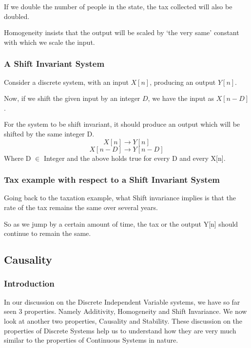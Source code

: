 If we double the number of people in the state, the tax collected will also be doubled. 

Homogeneity insists that the output will be scaled by ‘the very same’ constant with which we scale the input. 


\begin{figure}
\centering

\end{figure}



\subsubsection{A Shift Invariant System}
Consider a discrete system, with an input $X[n]$, producing an output $Y[n]$. 

Now, if we shift the given input by an integer $D$, we have the input as $X[n-D]$. 

For the system to be shift invariant, it should produce an output which will be shifted by the same integer D.
$$X[n]\rightarrow Y[n]$$
$$X[n-D]\rightarrow Y[n-D]$$
Where D $\in$ Integer and the above holds true for every D and every X[n].

\subsubsection{Tax example with respect to a Shift Invariant System}
Going back to the taxation example, what Shift invariance implies is that the rate of the tax remains the same over several years.

So as we jump by a certain amount of time, the tax or the output Y[n] should continue to remain the same.



\pagebreak

\subsection{Causality}

\subsubsection{Introduction}

In our discussion on the Discrete Independent Variable systems, we have so far seen 3 properties. Namely Additivity, Homogeneity and Shift Invariance. We now look at another two properties, Causality and Stability. These discussion on the properties of Discrete Systems help us to understand how they are very much similar to the properties of Continuous Systems in nature. 

